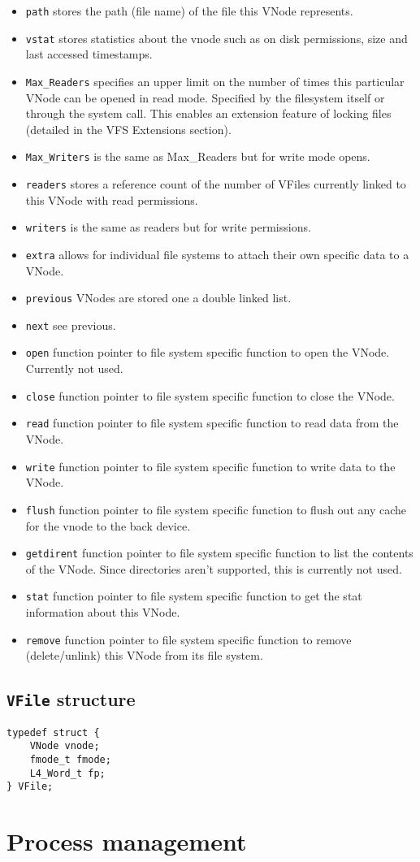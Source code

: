 \documentclass[12pt,english]{article}
\begin{document}
\begin{itemize}
\item \texttt{path} stores the path (file name) of the file this VNode represents.
\item \texttt{vstat} stores statistics about the vnode such as on disk permissions, size and last accessed timestamps.
\item \texttt{Max\_Readers} specifies an upper limit on the number of times this particular VNode can be opened in read mode. Specified by the filesystem itself or through the system call. This enables an extension feature of locking files (detailed in the VFS Extensions section).
\item \texttt{Max\_Writers} is the same as Max\_Readers but for write mode opens.
\item \texttt{readers} stores a reference count of the number of VFiles currently linked to this VNode with read permissions.
\item \texttt{writers} is the same as readers but for write permissions.
\item \texttt{extra} allows for individual file systems to attach their own specific data to a VNode.
\item \texttt{previous} VNodes are stored one a double linked list.
\item \texttt{next} see previous.
\item \texttt{open} function pointer to file system specific function to open the VNode. Currently not used.
\item \texttt{close} function pointer to file system specific function to close the VNode.
\item \texttt{read} function pointer to file system specific function to read data from the VNode.
\item \texttt{write} function pointer to file system specific function to write data to the VNode.
\item \texttt{flush} function pointer to file system specific function to flush out any cache for the vnode to the back device.
\item \texttt{getdirent} function pointer to file system specific function to list the contents of the VNode. Since directories aren't supported, this is currently not used.
\item \texttt{stat} function pointer to file system specific function to get the stat information about this VNode.
\item \texttt{remove} function pointer to file system specific function to remove (delete/unlink) this VNode from its file system.
\end{itemize}

\subsection{\texttt{VFile} structure}

\begin{verbatim}
typedef struct {
	VNode vnode;
	fmode_t fmode;
	L4_Word_t fp;
} VFile;
\end{verbatim}


\section{Process management}
\end{document}
